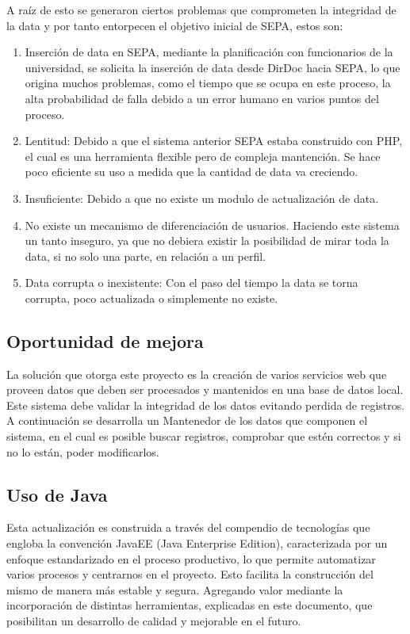\documentclass[a4paper,12pt,openany,oneside]{book}
\begin{document}
A raíz de esto se generaron ciertos problemas que comprometen la integridad de la data y por tanto entorpecen el objetivo inicial de SEPA, estos son:

\begin{enumerate}
	\item Inserción de data en SEPA, mediante la planificación con funcionarios de la universidad, se solicita la inserción de data desde DirDoc hacia SEPA, lo que origina muchos problemas, como el tiempo que se ocupa en este proceso, la alta probabilidad de falla debido a un error humano en varios puntos del proceso.
	\item Lentitud: Debido a que el sistema anterior SEPA estaba construido con PHP, el cual es una herramienta flexible pero de compleja mantención. Se hace poco eficiente su uso a medida que la cantidad de data va creciendo.
	\item Insuficiente: Debido a que no existe un modulo de actualización de data.
	\item No existe un mecanismo de diferenciación de usuarios. Haciendo este sistema un tanto inseguro, ya que no debiera existir la posibilidad de mirar toda la data, si no solo una parte, en relación a un perfil.
	\item Data corrupta o inexistente: Con el paso del tiempo la data se torna corrupta, poco actualizada o simplemente no existe.
\end{enumerate}
\subsection{Oportunidad de mejora}
La solución que otorga este proyecto es la creación de varios servicios web que proveen datos que deben ser procesados y mantenidos en una base de datos local. Este sistema debe validar la integridad de los datos evitando perdida de registros. A continuación se desarrolla un Mantenedor de los datos que componen el sistema, en el cual es posible buscar registros, comprobar que estén correctos y si no lo están, poder modificarlos.
\subsection{Uso de Java}
Esta actualización es construida a través del compendio de tecnologías que engloba la convención JavaEE (Java Enterprise Edition), caracterizada por un enfoque estandarizado en el proceso productivo, lo que permite automatizar varios procesos y centrarnos en el proyecto. Esto facilita la construcción del mismo de manera más estable y segura. Agregando valor mediante la incorporación de distintas herramientas, explicadas en este documento, que posibilitan un desarrollo de calidad y mejorable en el futuro.
\end{document}
